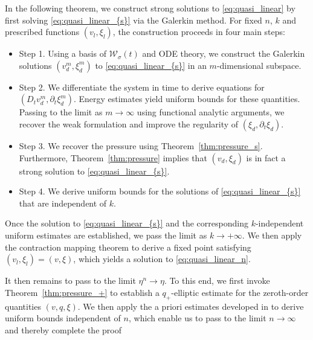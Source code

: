 \documentclass[letterpaper,reqno,10pt,twoside]{amsart}
\theoremstyle{definition}
\theoremstyle{remark}
\begin{document}
	In the following theorem, we construct strong solutions to \eqref{eq:quasi_linear} by first solving \eqref{eq:quasi_linear_{s}} via the Galerkin method. For fixed $n$, $k$ and prescribed functions $(v_{l},\xi_{l})$, the construction proceeds in four main steps:
	\begin{itemize}
		\item 
		Step 1. Using a basis of $\mathcal{W}_{\sigma}(t)$ and ODE theory, we construct the Galerkin solutions $(v_{d}^m, \xi_{d}^m)$ to \eqref{eq:quasi_linear_{s}} in an $m$-dimensional subspace.
		\item 
		Step 2. We differentiate the system in time to derive equations for $(D_t v_{d}^m, \partial_t \xi_{d}^m)$. Energy estimates yield uniform bounds for these quantities. Passing to the limit as $m \to \infty$ using functional analytic arguments, we recover the weak formulation and improve the regularity of $(\xi_{d}, \partial_t \xi_{d})$.
		\item 
		Step 3. We recover the pressure using Theorem~\ref{thm:pressure_s}. Furthermore, Theorem~\ref{thm:pressure} implies that $(v_{d}, \xi_{d})$ is in fact a strong solution to \eqref{eq:quasi_linear_{s}}.
		\item 
		Step 4. We derive uniform bounds for the solutions of \eqref{eq:quasi_linear_{s}} that are independent of $k$.
	\end{itemize}
	
	Once the solution to \eqref{eq:quasi_linear_{s}} and the corresponding $k$-independent uniform estimates are established, we pass the limit as $k \to +\infty$. We then apply the contraction mapping theorem to derive a fixed point satisfying $(v_{l}, \xi_{l}) = (v, \xi)$, which yields a solution to \eqref{eq:quasi_linear_n}.
	
	It then remains to pass to the limit $\eta^{n} \to \eta$. To this end, we first invoke Theorem~\ref{thm:pressure_+} to establish a $q_{+}$-elliptic estimate for the zeroth-order quantities $(v, q, \xi)$. We then apply the a priori estimates developed in \cite{GT2020} to derive uniform bounds independent of $n$, which enable us to pass to the limit $n \to \infty$ and thereby complete the proof
	
\end{document}
